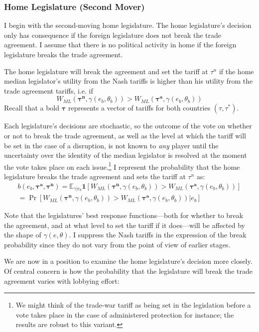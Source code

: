 \documentclass[10pt]{article}
\newcommand{\ve}{\theta}
\newcommand{\expect}{\mathbb{E}}
\newcommand{\bta}{\bm{\tau^a}}
\newcommand{\btn}{\bm{\tau^n}}
\newcommand{\ga}{\gamma}
\begin{document}
\subsubsection{Home Legislature (Second Mover)}
I begin with the second-moving home legislature. The home legislature's decision only has consequence if the foreign legislature does not break the trade agreement. I assume that there is no political activity in home if the foreign legislature breaks the trade agreement.

The home legislature will break the agreement and set the tariff at $\tau^n$ if the home median legislator's utility from the Nash tariffs is higher than his utility from the trade agreement tariffs, i.e. if
\begin{equation}
  W_{ML}(\btn,\ga(e_b,\ve_b)) > W_{ML}\left(\bta,\ga(e_b,\ve_b)\right)
  \label{eq:lwcg}
\end{equation}
\noindent Recall that a bold $\bm{\tau}$ represents a vector of tariffs for both countries $(\tau,\tau^*)$.
  
Each legislature's decisions are stochastic, so the outcome of the vote on whether or not to break the trade agreement, as well as the level at which the tariff will be set in the case of a disruption, is not known to \textit{any} player until the uncertainty over the identity of the median legislator is resolved at the moment the vote takes place on each issue.\footnote{We might think of the trade-war tariff as being set in the legislation before a vote takes place in the case of administered protection for instance; the results are robust to this variant.} I represent the probability that the home legislature breaks the trade agreement and sets the tariff at $\tau^n$ as:
\begin{multline}
  b(e_b,\bta,\btn) = \expect_{\ga|e_b} \bm{1} [ W_{ML}(\btn,\ga(e_b,\ve_b)) > W_{ML}\left(\bta,\ga(e_b,\ve_b)\right) ] \\ = \Pr [ W_{ML}(\btn,\ga(e_b,\ve_b)) > W_{ML}\left(\bta,\ga(e_b,\ve_b)\right) | e_b]
  \label{eq:b}
\end{multline}

Note that the legislatures' best response functions---both for whether to break the agreement, and at what level to set the tariff if it does---will be affected by the shape of $\ga(e,\ve)$. I suppress the Nash tariffs in the expression of the break probability since they do not vary from the point of view of earlier stages.

We are now in a position to examine the home legislature's decision more closely. Of central concern is how the probability that the legislature will break the trade agreement varies with lobbying effort: 
\end{document}

